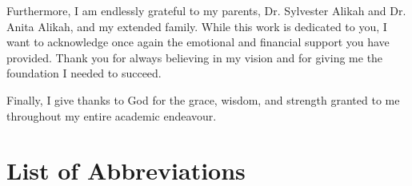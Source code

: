 \documentclass[12pt,a4paper]{report}
\begin{document}
Furthermore, I am endlessly grateful to my parents, Dr. Sylvester Alikah and Dr. Anita Alikah,
and my extended family. While this work is dedicated to you, I want to acknowledge once again
the emotional and financial support you have provided. Thank you for always believing in my
vision and for giving me the foundation I needed to succeed.

Finally, I give thanks to God for the grace, wisdom, and strength granted to me throughout
my entire academic endeavour.

\newpage

\chapter*{List of Abbreviations}
\end{document}
